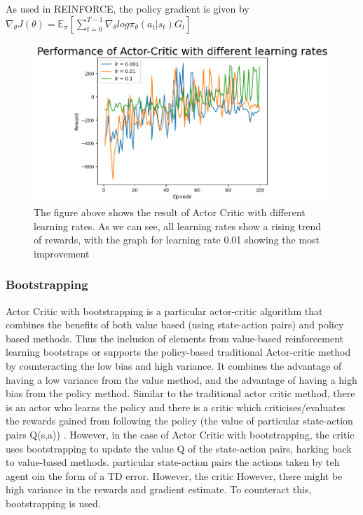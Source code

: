 \documentclass{article}
\begin{document}
 


\newline As used in REINFORCE, the policy gradient is given by 
\newline 
$\nabla_\theta J(\theta) = \mathbb{E}_\pi[\sum _{t=0}^{T-1} \nabla_\theta log\pi_\theta (a_t|s_t)G_t]$


\begin{figure}[htbp]
\centering
\includegraphics[width=1.2\linewidth]{Report/images/actor_critic_no_bs.png}
\caption{\label{fig:ActorCritic}The figure above shows the result of Actor Critic with different learning rates. As we can see, all learning rates show a rising trend of rewards, with the graph for learning rate 0.01 showing the most improvement}
\end{figure}



\subsubsection{Bootstrapping}
Actor Critic with bootstrapping is a particular actor-critic algorithm that combines the benefits of both value based (using state-action pairs) and policy based methods. Thus the inclusion of elements from value-based reinforcement learning bootstraps or supports the policy-based traditional Actor-critic method by counteracting the low bias and high variance. It combines the advantage of having a low variance from the value method, and the advantage of having a high bias from the policy method.
Similar to the traditional actor critic method, there is an actor who learns the policy and there is a critic which criticises/evaluates the rewards gained from following the policy (the value of particular state-action pairs Q(s,a)) . However, in the case of Actor Critic with bootstrapping, the critic uses bootstrapping to update the value Q of the state-action pairs, harking back to value-based methods. \newline 
particular state-action pairs  the actions taken by teh agent oin the form of a TD error. However, the critic 
However, there might be high variance in the rewards and gradient estimate. To counteract this, bootstrapping is used. 
\end{document}
